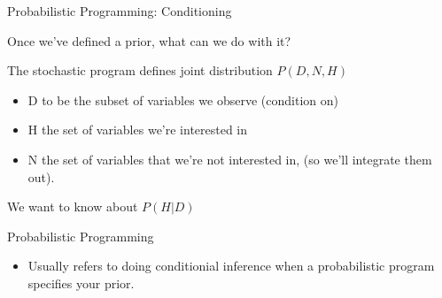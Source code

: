 \begin{frame}{Probabilistic Programming: Conditioning}
  \begin{block}{Once we've defined a prior, what can we do with it?}  

  The stochastic program defines joint distribution $P(D,N,H)$
  \begin{itemize}
    \item D to be the subset of variables we observe (condition on)
    \item H the set of variables we're interested in
    \item N the set of variables that we're not interested in, (so we'll integrate them out).
  \end{itemize}
  We want to know about $P(H|D)$
  \end{block}
  \begin{block}{Probabilistic Programming}
      \begin{itemize}
        \item Usually refers to doing conditionial inference when a probabilistic program specifies your prior.
      \end{itemize}
    \end{block}
\end{frame}

